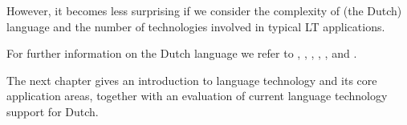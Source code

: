 \documentclass[]{../../metanetpaper}
\begin{document}
\begin{multicols}{2}
    However, it becomes less surprising if we consider the complexity of (the Dutch) language and the number of technologies involved in typical LT applications. 

    For further information on the Dutch language we refer to \cite{e-ans}, \cite{TUFenW}, \cite{NedWiki:Fries}, \cite{NedWiki:Nederlands}, \cite{NedWiki:Nedersaksisch},  \cite{Ethn-Dutch} and \cite{Ethn-LN}.

The next chapter gives an introduction to language technology and its core application areas, together with an evaluation of current language technology support for Dutch.
\end{multicols}

\clearpage


\end{document}

